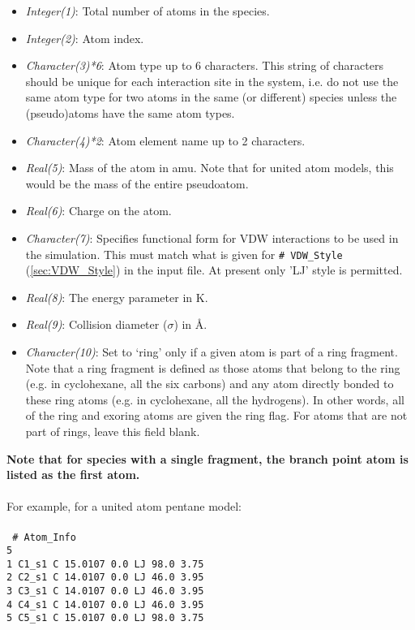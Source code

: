 \begin{itemize} 
%
\item {\it Integer(1)}: Total number of atoms in the species. 
%
\item {\it Integer(2)}: Atom index. 
%
\item {\it Character(3)*6}: Atom type up to 6 characters. This string of characters should be
unique for each interaction site in the system, i.e. do not use the same atom type
for two atoms in the same (or different) species unless the (pseudo)atoms have the same atom types. 
%
\item {\it Character(4)*2}: Atom element name up to 2 characters. 
%
\item {\it Real(5)}: Mass of the atom in amu. Note that for united atom models, this would be the
mass of the entire pseudoatom. 
%
\item {\it Real(6)}: Charge on the atom.
%
\item {\it Character(7)}: Specifies functional form for VDW interactions to be used in the simulation. This
must match what is given for \texttt{\# VDW\_Style} (\autoref{sec:VDW_Style}) in the input file.  
At present only 'LJ' style is permitted.
%
\item {\it Real(8)}: The energy parameter in K.
%
\item {\it Real(9)}: Collision diameter ($\sigma$)  in \AA.
%
\item {\it Character(10)}: Set to `ring' only if a given atom is part of a
ring fragment. Note that a ring fragment is defined as those atoms that belong to the ring
(e.g. in cyclohexane, all the six carbons) and any atom directly bonded to these ring atoms
(e.g. in cyclohexane, all the hydrogens).  In other words, all of the ring and exoring atoms are given the ring
flag. For atoms that are not part of rings, leave this field blank. 
\end{itemize} 
%
{\bf Note that for species with a single fragment, the branch point atom
 is listed as the first atom.} \\ \\
%
For example, for a united atom pentane model: \\ \\
%
\texttt{
\# Atom\_Info\\
5\\
1    C1\_s1    C    15.0107    0.0    LJ    98.0    3.75\\
2    C2\_s1    C    14.0107    0.0    LJ    46.0    3.95\\
3    C3\_s1    C    14.0107    0.0    LJ    46.0    3.95\\
4    C4\_s1    C    14.0107    0.0    LJ    46.0    3.95\\
5    C5\_s1    C    15.0107    0.0    LJ    98.0    3.75\\
} \\ 
